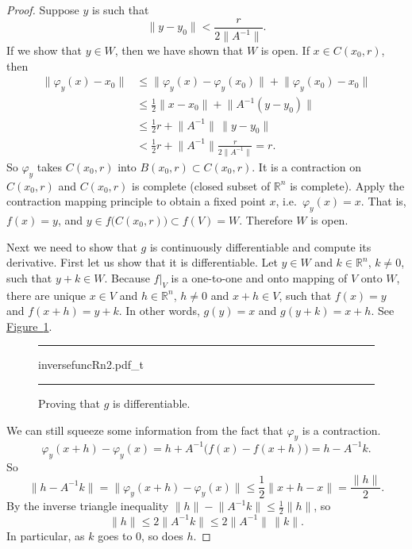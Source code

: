 \documentclass[12pt,openany]{book}
\newcommand{\snorm}[1]{\lVert {#1} \rVert}
\newcommand{\R}{{\mathbb{R}}}
\theoremstyle{plain}
\theoremstyle{remark}
\theoremstyle{definition}
\newenvironment{myfig}{%
\begin{figure}[h!t]
\noindent\rule{\textwidth}{0.4pt}\vspace{12pt}\par\centering}%
{\par\noindent\rule{\textwidth}{0.4pt}
\end{figure}}
\theoremstyle{exercise}
\theoremstyle{example}
\newcommand{\figureref}[1]{\hyperref[#1]{Figure~\ref*{#1}}}
\begin{document}
\begin{proof}
Suppose $y$ is such that
\begin{equation*}
\snorm{y-y_0} <
\frac{r}{2\snorm{A^{-1}}} .
\end{equation*}
If we show that $y \in W$, then we have shown that $W$ is open.
If $x \in
C(x_0,r)$, then
\begin{equation*}
\begin{split}
\snorm{\varphi_y(x)-x_0}
& \leq
\snorm{\varphi_y(x)-\varphi_y(x_0)} +
\snorm{\varphi_y(x_0)-x_0} \\
& \leq
\frac{1}{2}\snorm{x-x_0} +
\snorm{A^{-1}(y-y_0)} \\
& \leq
\frac{1}{2}r +
\snorm{A^{-1}} \, \snorm{y-y_0} \\
& <
\frac{1}{2}r +
\snorm{A^{-1}}
\frac{r}{2\snorm{A^{-1}}} = r .
\end{split}
\end{equation*}
So $\varphi_y$ takes $C(x_0,r)$ into $B(x_0,r) \subset C(x_0,r)$.  It is a
contraction on $C(x_0,r)$ and $C(x_0,r)$ is complete (closed subset of $\R^n$
is complete).
Apply the contraction mapping principle to obtain a fixed point $x$,
i.e.\ $\varphi_y(x) = x$.  That is, $f(x) = y$, and $y \in
f\bigl(C(x_0,r)\bigr) \subset f(V) = W$.  Therefore $W$ is open.

Next we need to show that $g$ is continuously differentiable and compute
its derivative.  First let us show that it is differentiable.
Let $y \in W$ and $k \in \R^n$, $k\not= 0$, such that $y+k \in W$.
Because $f|_V$ is a one-to-one and onto mapping of $V$ onto $W$,
there are unique
$x \in V$ and $h \in \R^n$, $h \not= 0$ and $x+h \in V$, such that
$f(x) = y$ and $f(x+h) = y+k$.
In other words, $g(y) = x$ and $g(y+k) = x+h$.  See
\figureref{fig:inversefuncRn2}.
\begin{myfig}
{inversefuncRn2.pdf_t}
\caption{Proving that $g$ is differentiable.\label{fig:inversefuncRn2}}
\end{myfig}

We can still
squeeze some information from the fact that $\varphi_y$ is a contraction.
\begin{equation*}
\varphi_y(x+h)-\varphi_y(x) = h + A^{-1} \bigl( f(x)-f(x+h) \bigr) = h - A^{-1} k .
\end{equation*}
So
\begin{equation*}
\snorm{h-A^{-1}k} = \snorm{\varphi_y(x+h)-\varphi_y(x)} \leq
\frac{1}{2}\snorm{x+h-x} = \frac{\snorm{h}}{2}.
\end{equation*}
By the inverse triangle inequality $\snorm{h} - \snorm{A^{-1}k} \leq
\frac{1}{2}\snorm{h}$, so
\begin{equation*}
\snorm{h} \leq 2 \snorm{A^{-1}k} \leq 2 \snorm{A^{-1}} \, \snorm{k}.
\end{equation*}
In particular, as $k$ goes to 0, so does $h$.


\end{proof}
\end{document}
